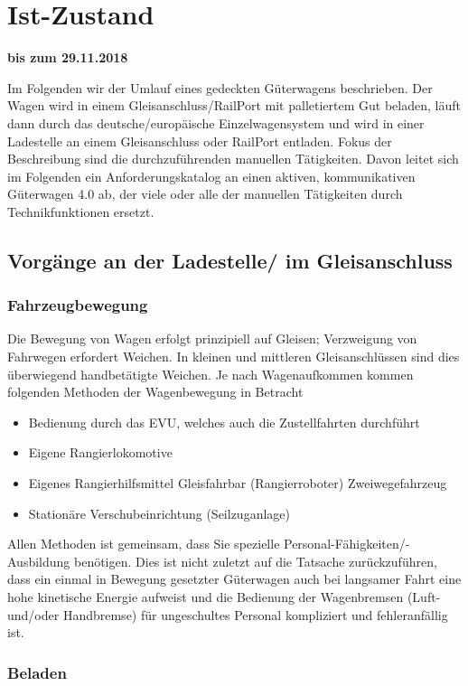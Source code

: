 \section{Ist-Zustand}
\textbf{bis zum 29.11.2018}

Im Folgenden wir der Umlauf eines gedeckten Güterwagens beschrieben. Der Wagen wird in einem Gleisanschluss/RailPort mit palletiertem Gut beladen, läuft dann durch das deutsche/europäische Einzelwagensystem und wird in einer Ladestelle an einem Gleisanschluss oder RailPort entladen. Fokus der Beschreibung sind die durchzuführenden manuellen Tätigkeiten. Davon leitet sich im Folgenden ein Anforderungskatalog an einen aktiven, kommunikativen Güterwagen 4.0 ab, der viele oder alle der manuellen Tätigkeiten durch Technikfunktionen ersetzt.

\subsection{Vorgänge an der Ladestelle/ im Gleisanschluss}

\subsubsection{Fahrzeugbewegung}

Die Bewegung von Wagen erfolgt prinzipiell auf Gleisen; Verzweigung von Fahrwegen erfordert Weichen. In kleinen und mittleren Gleisanschlüssen sind dies überwiegend handbetätigte Weichen. Je nach Wagenaufkommen kommen folgenden Methoden der Wagenbewegung in Betracht
\begin{itemize}
	\item Bedienung durch das EVU, welches auch die Zustellfahrten durchführt
	\item Eigene Rangierlokomotive
	\item Eigenes Rangierhilfsmittel
		\subitem Gleisfahrbar (Rangierroboter)
		\subitem Zweiwegefahrzeug
	\item Stationäre Verschubeinrichtung (Seilzuganlage)
\end{itemize}
Allen Methoden ist gemeinsam, dass Sie spezielle Personal-Fähigkeiten/-Ausbildung benötigen. Dies ist nicht zuletzt auf die Tatsache zurückzuführen, dass ein einmal in Bewegung gesetzter Güterwagen auch bei langsamer Fahrt eine hohe kinetische Energie aufweist und die Bedienung der Wagenbremsen (Luft- und/oder Handbremse) für ungeschultes Personal kompliziert und fehleranfällig ist.

\subsubsection{Beladen}


